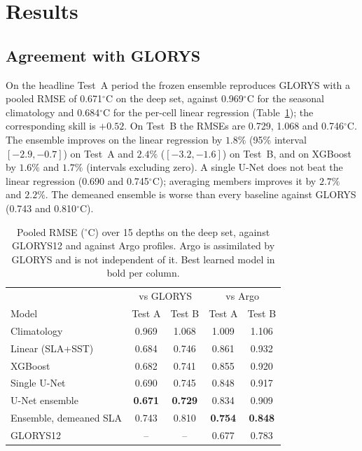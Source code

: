 
\section{Results}
\label{sec:results}

\subsection{Agreement with GLORYS}
On the headline Test~A period the frozen ensemble reproduces GLORYS with a pooled RMSE of 0.671$^\circ$C on the deep set, against 0.969$^\circ$C for the seasonal climatology and 0.684$^\circ$C for the per-cell linear regression (Table~\ref{tab:main}); the corresponding skill is $+0.52$. On Test~B the RMSEs are 0.729, 1.068 and 0.746$^\circ$C. The ensemble improves on the linear regression by $1.8\%$ (95\% interval $[-2.9,-0.7]$) on Test~A and $2.4\%$ ($[-3.2,-1.6]$) on Test~B, and on XGBoost by $1.6\%$ and $1.7\%$ (intervals excluding zero). A single U-Net does not beat the linear regression (0.690 and 0.745$^\circ$C); averaging members improves it by $2.7\%$ and $2.2\%$. The demeaned ensemble is worse than every baseline against GLORYS (0.743 and 0.810$^\circ$C).

\begin{table}[t]
\centering
\caption{Pooled RMSE ($^\circ$C) over 15 depths on the deep set, against GLORYS12 and against Argo profiles. Argo is assimilated by GLORYS and is not independent of it. Best learned model in bold per column.}
\label{tab:main}
\begin{tabular}{@{}lcccc@{}}
\hline
 & \multicolumn{2}{c}{vs GLORYS} & \multicolumn{2}{c}{vs Argo} \\
Model & Test A & Test B & Test A & Test B \\
\hline
Climatology & 0.969 & 1.068 & 1.009 & 1.106 \\
Linear (SLA+SST) & 0.684 & 0.746 & 0.861 & 0.932 \\
XGBoost & 0.682 & 0.741 & 0.855 & 0.920 \\
Single U-Net & 0.690 & 0.745 & 0.848 & 0.917 \\
U-Net ensemble & \textbf{0.671} & \textbf{0.729} & 0.834 & 0.909 \\
Ensemble, demeaned SLA & 0.743 & 0.810 & \textbf{0.754} & \textbf{0.848} \\
\hline
GLORYS12 & -- & -- & 0.677 & 0.783 \\
\hline
\end{tabular}
\end{table}

